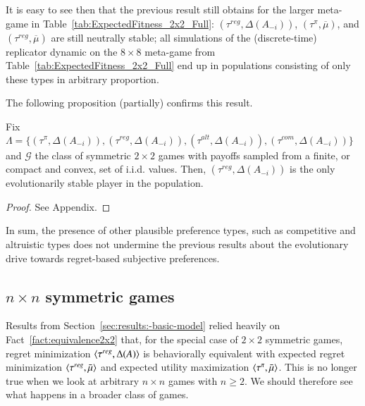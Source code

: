 \documentclass[fleqn,reqno,11pt]{article}
\begin{document}
It is easy to see then that the previous result still obtains for the larger meta-game in
Table~\ref{tab:ExpectedFitness_2x2_Full}: $(\tau^{reg}, \Delta(A_{-i}))$,
$(\tau^{\pi}, \overline{\mu})$, and $(\tau^{reg}, \overline{\mu})$ are still neutrally stable;
all simulations of the (discrete-time) replicator dynamic on the $8 \times 8$ meta-game from
Table~\ref{tab:ExpectedFitness_2x2_Full} end up in populations consisting of only these types
in arbitrary proportion.

The following proposition (partially) confirms this result.

\begin{proposition} \label{proposition2}

Fix $\Lambda = \lbrace (\tau^{\pi}, \Delta(A_{-i})), (\tau^{reg}, \Delta(A_{-i})), (\tau^{alt}, \Delta(A_{-i})), (\tau^{com}, \Delta(A_{-i})) \rbrace$ and $\mathcal{G}$ the class of symmetric $2 \times 2$ games with payoffs sampled from a finite, or compact and convex, set of i.i.d. values. Then, $(\tau^{reg}, \Delta(A_{-i}))$ is the only evolutionarily stable player in the population.

\end{proposition}

\begin{proof}
See Appendix.
\end{proof}

In sum, the presence of other plausible preference types, such as competitive and altruistic
types does not undermine the previous results about the evolutionary drive towards regret-based
subjective preferences.


                                   
\subsection{$n \times n$ symmetric games}
\label{sec:n-times-n}

Results from Section~\ref{sec:results:-basic-model} relied heavily on
Fact~\ref{fact:equivalence2x2} that, for the special case of $2 \times 2$ symmetric games,
regret minimization $\left \langle \tau^{reg}, \Delta(A)\right\rangle$ is behaviorally equivalent with expected
regret minimization $\left \langle \tau^{reg}, \bar{\mu}\right\rangle$ and expected utility maximization
$\left \langle \tau^{\pi}, \bar{\mu}\right\rangle$. This is no longer true when we look at arbitrary $n \times n$
games with $n \ge 2$. We should therefore see what happens in a broader class of games.
\end{document}
